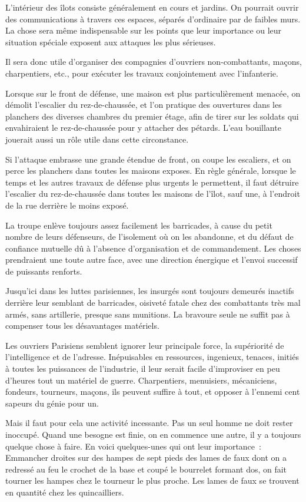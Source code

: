 \documentclass[french,twoside]{book} %
\begin{document}
L'intérieur des îlots consiste généralement en cours et jardins. On pourrait ouvrir des communications à travers ces espaces, séparés d’ordinaire par de faibles murs. La chose sera même indispensable sur les points que leur importance ou leur situation spéciale exposent aux attaques les plus sérieuses.\par
Il sera donc utile d’organiser des compagnies d’ouvriers non-combattants, maçons, charpentiers, etc., pour exécuter les travaux conjointement avec l’infanterie.\par
Lorsque sur le front de défense, une maison est plus particulièrement menacée, on démolit l’escalier du rez-de-chaussée, et l’on pratique des ouvertures dans les planchers des diverses chambres du premier étage, afin de tirer sur les soldats qui envahiraient le rez-de-chaussée pour y attacher des pétards. L'eau bouillante jouerait aussi un rôle utile dans cette circonstance.\par
Si l’attaque embrasse une grande étendue de front, on coupe les escaliers, et on perce les planchers dans toutes les maisons exposes. En règle générale, lorsque le temps et les autres travaux de défense plus urgents le permettent, il faut détruire l’escalier du rez-de-chaussée dans toutes les maisons de l’îlot, sauf une, à l’endroit de la rue derrière le moins exposé.\par
La troupe enlève toujours assez facilement les barricades, à cause du petit nombre de leurs défenseurs, de l’isolement où on les abandonne, et du défaut de confiance mutuelle dû à l’absence d’organisation et de commandement. Les choses prendraient une toute autre face, avec une direction énergique et l’envoi successif de puissants renforts.\par
Jusqu’ici dans les luttes parisiennes, les insurgés sont toujours demeurés inactifs derrière leur semblant de barricades, oisiveté fatale chez des combattants très mal armés, sans artillerie, presque sans munitions. La bravoure seule ne suffit pas à compenser tous les désavantages matériels.\par
Les ouvriers Parisiens semblent ignorer leur principale force, la supériorité de l’intelligence et de l’adresse. Inépuisables en ressources, ingenieux, tenaces, initiés à toutes les puissances de l’industrie, il leur serait facile d’improviser en peu d’heures tout un matériel de guerre. Charpentiers, menuisiers, mécaniciens, fondeurs, tourneurs, maçons, ils peuvent suffire à tout, et opposer à l’ennemi cent sapeurs du génie pour un.\par
Mais il faut pour cela une activité incessante. Pas un seul homme ne doit rester inoccupé. Quand une besogne est finie, on en commence une autre, il y a toujours quelque chose à faire. En voici quelques-unes qui ont leur importance : Emmancher droites sur des hampes de sept pieds des lames de faux dont on a redressé au feu le crochet de la base et coupé le bourrelet formant dos, on fait tourner les hampes chez le tourneur le plus proche. Les lames de faux se trouvent en quantité chez les quincailliers.\par
\end{document}
